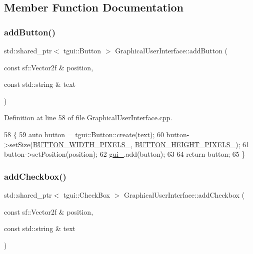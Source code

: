\subsection{Member Function Documentation}
\mbox{\label{classGraphicalUserInterface_a91abd8446fe18cee7ff63a541a79da56}} 
\subsubsection{\texorpdfstring{add\+Button()}{addButton()}}
{\footnotesize\ttfamily std\+::shared\+\_\+ptr$<$ tgui\+::\+Button $>$ Graphical\+User\+Interface\+::add\+Button (\begin{DoxyParamCaption}\item[{const sf\+::\+Vector2f \&}]{position,  }\item[{const std\+::string \&}]{text }\end{DoxyParamCaption})\hspace{0.3cm}{\ttfamily [private]}}



Definition at line 58 of file Graphical\+User\+Interface.\+cpp.


\begin{DoxyCode}
58                                                                                                            
        \{
59     \textcolor{keyword}{auto} button = tgui::Button::create(text);
60     button->setSize(\hyperlink{classGraphicalUserInterface_a90c125308f85a684fa6e609d474f4550}{BUTTON\_WIDTH\_PIXELS\_}, 
      \hyperlink{classGraphicalUserInterface_a16c6d010f7594c76c3d4b50f7cb4764b}{BUTTON\_HEIGHT\_PIXELS\_});
61     button->setPosition(position);
62     \hyperlink{classGraphicalUserInterface_ab07abda0fdb8e2965b70d2024fa3cf20}{gui\_}.add(button);
63 
64     \textcolor{keywordflow}{return} button;
65 \}
\end{DoxyCode}
\mbox{\label{classGraphicalUserInterface_ac7094ec5d8ec8edd7325072f97f8de59}} 
\subsubsection{\texorpdfstring{add\+Checkbox()}{addCheckbox()}}
{\footnotesize\ttfamily std\+::shared\+\_\+ptr$<$ tgui\+::\+Check\+Box $>$ Graphical\+User\+Interface\+::add\+Checkbox (\begin{DoxyParamCaption}\item[{const sf\+::\+Vector2f \&}]{position,  }\item[{const std\+::string \&}]{text }\end{DoxyParamCaption})\hspace{0.3cm}{\ttfamily [private]}}



